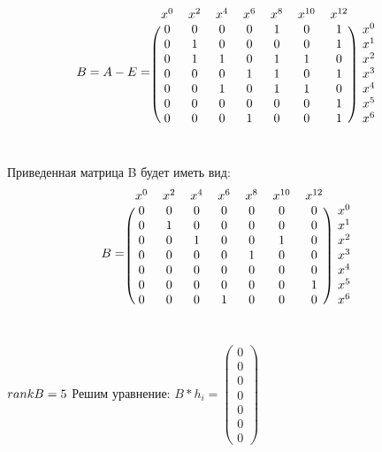 \documentclass[12pt]{article}
\begin{document}
\[
    B = A - E =
    \begin{blockarray}{cccccccc}
        x^0 & x^2 & x^4 & x^6 & x^8 & x^{10} & x^{12}\\
        \begin{block}{(ccccccc)c}
            0 & 0 & 0 & 0 & 1 & 0 & 1 & x^0\\
            0 & 1 & 0 & 0 & 0 & 0 & 1 & x^1\\
            0 & 1 & 1 & 0 & 1 & 1 & 0 & x^2\\
            0 & 0 & 0 & 1 & 1 & 0 & 1 & x^3\\
            0 & 0 & 1 & 0 & 1 & 1 & 0 & x^4\\
            0 & 0 & 0 & 0 & 0 & 0 & 1 & x^5\\
            0 & 0 & 0 & 1 & 0 & 0 & 1 & x^6\\
        \end{block}
    \end{blockarray}
\]\\
Приведенная матрица B будет иметь вид:\\
\[
    B =
    \begin{blockarray}{cccccccc}
        x^0 & x^2 & x^4 & x^6 & x^8 & x^{10} & x^{12}\\
        \begin{block}{(ccccccc)c}
            0 & 0 & 0 & 0 & 0 & 0 & 0 & x^0\\
            0 & 1 & 0 & 0 & 0 & 0 & 0 & x^1\\
            0 & 0 & 1 & 0 & 0 & 1 & 0 & x^2\\
            0 & 0 & 0 & 0 & 1 & 0 & 0 & x^3\\
            0 & 0 & 0 & 0 & 0 & 0 & 0 & x^4\\
            0 & 0 & 0 & 0 & 0 & 0 & 1 & x^5\\
            0 & 0 & 0 & 1 & 0 & 0 & 0 & x^6\\
        \end{block}
    \end{blockarray}
\]\\
$rank B = 5\\$
    Решим уравнение: $B * h_i= \begin{pmatrix}
    0 \\
    0 \\
    0 \\
    0 \\
    0 \\
    0 \\
    0
\end{pmatrix}$\\\\
\end{document}
